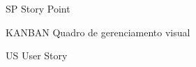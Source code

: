 
\begin{siglas}
    \item[SP] Story Point
    \item[KANBAN] Quadro de gerenciamento visual
    \item[US] User Story
\end{siglas}
